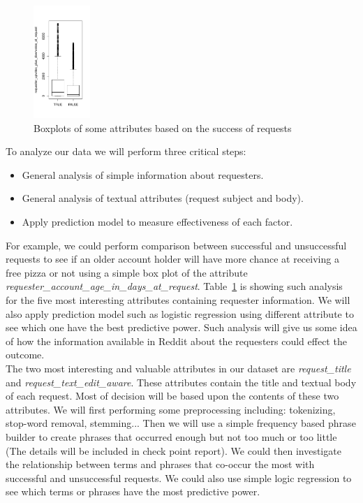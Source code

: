 \begin{figure}
	\includegraphics[width=0.19\textwidth]{data/requester_upvotes_plus_downvotes_at_request}
	\caption{Boxplots of some attributes based on the success of requests}
	\label{boxplot}
\end{figure}

To analyze our data we will perform three critical steps:

\begin{itemize}
	\item General analysis of simple information about requesters.
	\item General analysis of textual attributes (request subject and body).
	\item Apply prediction model to measure effectiveness of each factor.
\end{itemize}

For example, we could perform comparison between successful and unsuccessful requests to see if an older account holder will have more chance at receiving a free pizza or not using a simple box plot of the attribute \textit{requester\_account\_age\_in\_days\_at\_request}. Table~\ref{boxplot} is showing such analysis for the five most interesting attributes containing requester information. We will also apply prediction model such as logistic regression using different attribute to see which one have the best predictive power. Such analysis will give us some idea of how the information available in Reddit about the requesters could effect the outcome.\\

The two most interesting and valuable attributes in our dataset are \textit{request\_title} and \textit{request\_text\_edit\_aware}. These attributes contain the title and textual body of each request. Most of decision will be based upon the contents of these two attributes. We will first performing some preprocessing including:  tokenizing, stop-word removal, stemming... Then we will use a simple frequency based phrase builder to create phrases that occurred enough but not too much or too little (The details will be included in check point report). We could then investigate the relationship between terms and phrases that co-occur the most with successful and unsuccessful requests. We could also use simple logic regression to see which terms or phrases have the most predictive power.\\

